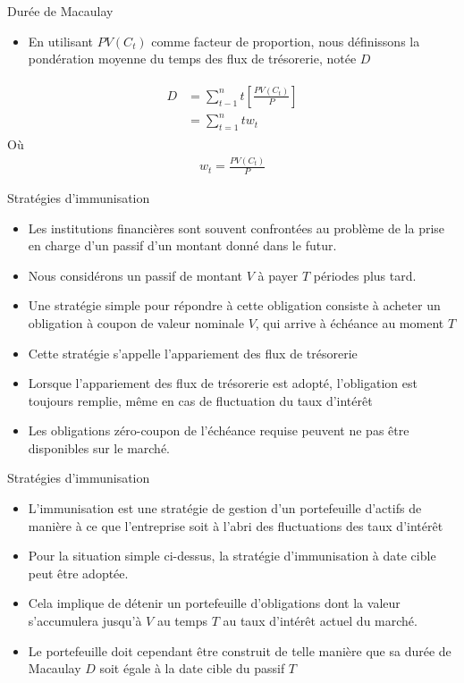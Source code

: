 \documentclass[10pt,a4paper]{beamer}
\begin{document}
\begin{frame}{Durée de Macaulay}
\begin{itemize}[label=\bullet]
\item En utilisant $PV(C_t)$ comme facteur de proportion, nous définissons la pondération moyenne du temps des flux de trésorerie, notée $D$
\end{itemize}
\begin{align*}
\begin{split}
D & =\sum_{t-1}^n t \left[ \frac{PV(C_t)}{P} \right]\\
&=\sum_{t=1}^n tw_t
\end{split}
\end{align*}
Où 
\begin{align*}
w_t=\frac{PV(C_t)}{P}
\end{align*}
\end{frame}

\begin{frame}{Stratégies d'immunisation}
\begin{itemize}[label=\bullet]
\item Les institutions financières sont souvent confrontées au problème de la prise en charge d'un passif d'un montant donné dans le futur.
\item Nous considérons un passif de montant $V$ à payer $T$ périodes plus tard.
\item Une stratégie simple pour répondre à cette obligation consiste à acheter un obligation à coupon de valeur nominale $V$, qui arrive à échéance au moment $T$
\item Cette stratégie s'appelle l'appariement des flux de trésorerie
\item Lorsque l'appariement des flux de trésorerie est adopté, l'obligation est toujours remplie, même en cas de fluctuation du taux d'intérêt
\item Les obligations zéro-coupon de l'échéance requise peuvent ne pas être disponibles sur le marché.
\end{itemize}
\end{frame}

\begin{frame}{Stratégies d'immunisation}
\begin{itemize}[label=\bullet]
\item L'immunisation est une stratégie de gestion d'un portefeuille d'actifs de manière à ce que l'entreprise soit à l'abri des fluctuations des taux d'intérêt
\item Pour la situation simple ci-dessus, la stratégie d'immunisation à date cible peut être adoptée.
\item Cela implique de détenir un portefeuille d'obligations dont la valeur s'accumulera jusqu'à $V$ au temps $T$ au taux d'intérêt actuel du marché.
\item Le portefeuille doit cependant être construit de telle manière que sa durée de Macaulay $D$ soit égale à la date cible du passif $T$
\end{itemize}

\end{frame}
\end{document}

